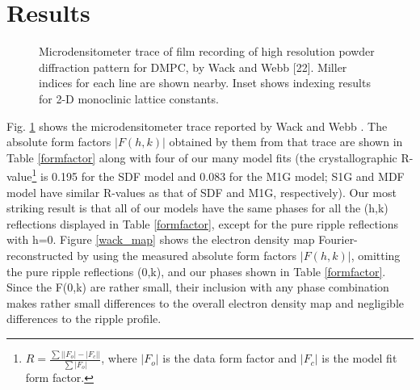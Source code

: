 \section{Results}

\begin{figure}
\centerline {}
\caption{
Microdensitometer trace of film recording of high resolution
powder diffraction pattern for DMPC, by Wack and Webb [22].
Miller indices for each line are shown nearby. Inset shows indexing results 
for 2-D monoclinic lattice constants.
\label{wack_trace}}
\end{figure}

Fig. \ref{wack_trace} shows the microdensitometer trace reported by Wack 
and Webb \cite{Wac89a}.
The absolute form factors $|F(h,k)|$ obtained by them from that trace
are shown in Table \ref{formfactor} along with four of our many model fits
(the crystallographic R-value\footnote{\(R=\frac{\sum \left| |F_o| - |F_c|
\right|}{\sum |F_o|}\), where $|F_o|$ is the data form factor and $|F_c|$
is the model fit form factor.} is 0.195 for the SDF model and 
0.083 for the M1G model; S1G and MDF model have similar R-values as that
of SDF and M1G, respectively).
Our most striking result is that all of our models have the same
phases for all the (h,k) reflections displayed in Table \ref{formfactor},
except for the pure ripple reflections with h=0.  Figure \ref{wack_map} 
shows the electron density map Fourier-reconstructed by using the measured 
\cite{Wac89a} absolute form factors $|F(h,k)|$, omitting the pure ripple 
reflections (0,k), and our phases shown in Table \ref{formfactor}.
Since the F(0,k) are rather small, their inclusion with any phase
combination makes rather small differences to the overall electron
density map and negligible differences to the ripple profile.

